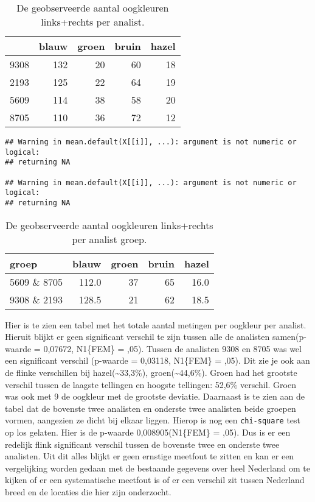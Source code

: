 \documentclass[
]{article}
\begin{document}
\begin{longtable}[t]{l|r|r|r|r}
\caption{\label{tab:analist-oogkleur-chi-square}De geobserveerde aantal oogkleuren links+rechts per analist.}\\
\hline
  & blauw & groen & bruin & hazel\\
\hline
9308 & 132 & 20 & 60 & 18\\
\hline
2193 & 125 & 22 & 64 & 19\\
\hline
5609 & 114 & 38 & 58 & 20\\
\hline
8705 & 110 & 36 & 72 & 12\\
\hline
\end{longtable}

\begin{verbatim}
## Warning in mean.default(X[[i]], ...): argument is not numeric or logical:
## returning NA

## Warning in mean.default(X[[i]], ...): argument is not numeric or logical:
## returning NA
\end{verbatim}

\begin{longtable}[t]{l|r|r|r|r}
\caption{\label{tab:analist-oogkleur-chi-square}De geobserveerde aantal oogkleuren links+rechts per analist groep.}\\
\hline
groep & blauw & groen & bruin & hazel\\
\hline
5609 \& 8705 & 112.0 & 37 & 65 & 16.0\\
\hline
9308 \& 2193 & 128.5 & 21 & 62 & 18.5\\
\hline
\end{longtable}

Hier is te zien een tabel met het totale aantal metingen per oogkleur
per analist. Hieruit blijkt er geen significant verschil te zijn tussen
alle de analisten samen(p-waarde = 0,07672, N1\{FEM\} = ,05). Tussen de
analisten 9308 en 8705 was wel een significant verschil (p-waarde =
0,03118, N1\{FEM\} = ,05). Dit zie je ook aan de flinke verschillen bij
hazel(\textasciitilde33,3\%), groen(\textasciitilde44,6\%). Groen had het grootste verschil tussen
de laagste tellingen en hoogste tellingen: 52,6\% verschil. Groen was ook
met 9 de oogkleur met de grootste deviatie. Daarnaast is te zien aan de
tabel dat de bovenste twee analisten en onderste twee analisten beide
groepen vormen, aangezien ze dicht bij elkaar liggen. Hierop is nog een
\texttt{chi-square} test op los gelaten. Hier is de p-waarde 0,008905(N1\{FEM\} =
,05). Dus is er een redelijk flink significant verschil tussen de
bovenste twee en onderste twee analisten. Uit dit alles blijkt er geen
ernstige meetfout te zitten en kan er een vergelijking worden gedaan met
de bestaande gegevens over heel Nederland om te kijken of er een
systematische meetfout is of er een verschil zit tussen Nederland breed
en de locaties die hier zijn onderzocht.
\end{document}
